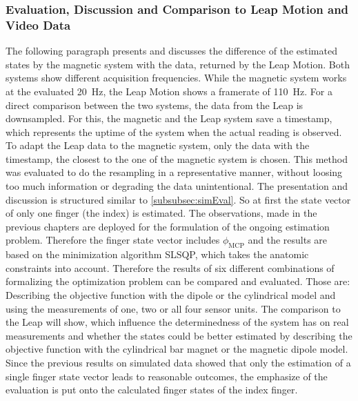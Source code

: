 \FloatBarrier
\subsubsection{Evaluation, Discussion and Comparison to Leap Motion and Video Data}

The following paragraph presents and discusses the difference of the estimated states by the magnetic system with the data, returned by the Leap Motion. Both systems show different acquisition frequencies. While the magnetic system works at the evaluated \SI{20}{\Hz}, the Leap Motion shows a framerate of \SI{110}{\Hz}. For a direct comparison between the two systems, the data from the Leap is downsampled. For this, the magnetic and the Leap system save a timestamp, which represents the uptime of the system when the actual reading is observed. To adapt the Leap data to the magnetic system, only the data with the timestamp, the closest to the one of the magnetic system is chosen. This method was evaluated to do the resampling in a representative manner, without loosing too much information or degrading the data unintentional. 
The presentation and discussion is structured similar to \ref{subsubsec:simEval}. So at first the state vector of only one finger (the index) is estimated. The observations, made in the previous chapters are deployed for the formulation of the ongoing estimation problem. Therefore the finger state vector includes $ \phi_{\mathrm{MCP}} $ and the results are based on the minimization algorithm \ac{SLSQP}, which takes the anatomic constraints into account. 
Therefore the results of six different combinations of formalizing the optimization problem can be compared and evaluated. Those are: Describing the objective function with the dipole or the cylindrical model and using the measurements of one, two or all four sensor units. The comparison to the Leap will show, which influence the determinedness of the system has on real measurements and whether the states could be better estimated by describing the objective function with the cylindrical bar magnet or the magnetic dipole model. Since the previous results on simulated data showed that only the estimation of a single finger state vector leads to reasonable outcomes, the emphasize of the evaluation is put onto the calculated finger states of the index finger.

